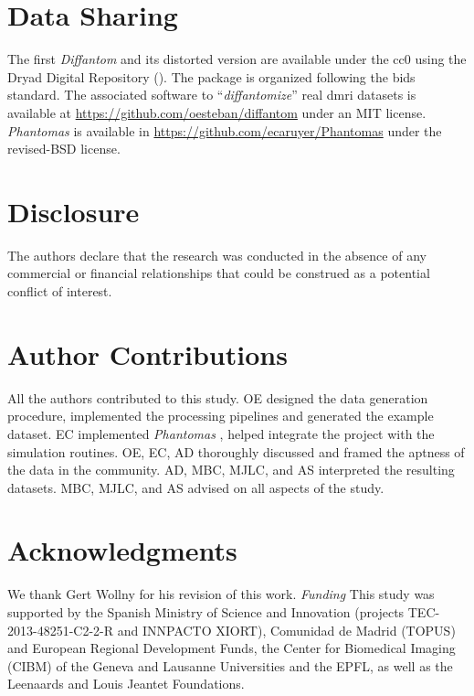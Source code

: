 \documentclass[english]{frontiers/frontiersSCNS} %
\providecommand{\diffantom}{\emph{Diffantom}}
\begin{document}
\section*{Data Sharing}
The first \diffantom{} and its distorted version are available under the \gls*{cc0} using the Dryad Digital Repository
  ().
The package is organized following the \gls*{bids} standard.
The associated software to ``\emph{diffantomize}'' real \gls*{dmri} datasets is available at
  \url{https://github.com/oesteban/diffantom} under an MIT license.
\emph{Phantomas} is available in \url{https://github.com/ecaruyer/Phantomas} under the revised-BSD license.

\section*{Disclosure}

The authors declare that the research was conducted in the absence of any commercial or financial relationships that could be construed as a potential conflict of interest.

\section*{Author Contributions}
All the authors contributed to this study.
OE designed the data generation procedure, implemented the processing pipelines and generated the example dataset.
EC implemented \emph{Phantomas} \citep{caruyer_phantomas_2014}, helped integrate the project with the simulation routines.
OE, EC, AD thoroughly discussed and framed the aptness of the data in the community.
AD, MBC, MJLC, and AS interpreted the resulting datasets.
MBC, MJLC, and AS advised on all aspects of the study.


\section*{Acknowledgments}
We thank Gert Wollny for his revision of this work.
\textit{Funding\textcolon}
This study was supported by the Spanish Ministry of Science and Innovation
  (projects TEC-2013-48251-C2-2-R and INNPACTO XIORT), Comunidad de Madrid (TOPUS) and
  European Regional Development Funds, the Center for Biomedical Imaging
  (CIBM) of the Geneva and Lausanne Universities and the EPFL, as well as the
  Leenaards and Louis Jeantet Foundations.

\nolinenumbers


\end{document}
